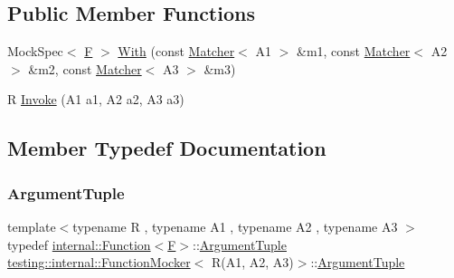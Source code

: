 \subsection*{Public Member Functions}
\begin{DoxyCompactItemize}
\item 
Mock\+Spec$<$ \mbox{\hyperlink{classtesting_1_1internal_1_1FunctionMocker_3_01R_07A1_00_01A2_00_01A3_08_4_a8c471830f963b8012785eb3eeca2cc9c}{F}} $>$ \mbox{\hyperlink{classtesting_1_1internal_1_1FunctionMocker_3_01R_07A1_00_01A2_00_01A3_08_4_a06fc66e2e75ff98d257966e7234bb833}{With}} (const \mbox{\hyperlink{classtesting_1_1Matcher}{Matcher}}$<$ A1 $>$ \&m1, const \mbox{\hyperlink{classtesting_1_1Matcher}{Matcher}}$<$ A2 $>$ \&m2, const \mbox{\hyperlink{classtesting_1_1Matcher}{Matcher}}$<$ A3 $>$ \&m3)
\item 
R \mbox{\hyperlink{classtesting_1_1internal_1_1FunctionMocker_3_01R_07A1_00_01A2_00_01A3_08_4_a2afad9e39ca64acc6b178fa415907c5b}{Invoke}} (A1 a1, A2 a2, A3 a3)
\end{DoxyCompactItemize}


\subsection{Member Typedef Documentation}
\mbox{\label{classtesting_1_1internal_1_1FunctionMocker_3_01R_07A1_00_01A2_00_01A3_08_4_a347dcf4c054a5f1fbd0e2f0ad1c5e2f3}} 
\subsubsection{\texorpdfstring{ArgumentTuple}{ArgumentTuple}}
{\footnotesize\ttfamily template$<$typename R , typename A1 , typename A2 , typename A3 $>$ \\
typedef \mbox{\hyperlink{structtesting_1_1internal_1_1Function}{internal\+::\+Function}}$<$\mbox{\hyperlink{classtesting_1_1internal_1_1FunctionMocker_3_01R_07A1_00_01A2_00_01A3_08_4_a8c471830f963b8012785eb3eeca2cc9c}{F}}$>$\+::\mbox{\hyperlink{classtesting_1_1internal_1_1FunctionMocker_3_01R_07A1_00_01A2_00_01A3_08_4_a347dcf4c054a5f1fbd0e2f0ad1c5e2f3}{Argument\+Tuple}} \mbox{\hyperlink{classtesting_1_1internal_1_1FunctionMocker}{testing\+::internal\+::\+Function\+Mocker}}$<$ R(A1, A2, A3)$>$\+::\mbox{\hyperlink{classtesting_1_1internal_1_1FunctionMocker_3_01R_07A1_00_01A2_00_01A3_08_4_a347dcf4c054a5f1fbd0e2f0ad1c5e2f3}{Argument\+Tuple}}}

